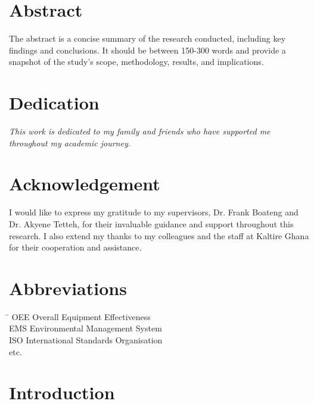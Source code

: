 \documentclass[12pt,a4paper]{report}
\begin{document}
	\chapter*{Abstract}
	The abstract is a concise summary of the research conducted, including key findings and conclusions. It should be between 150-300 words and provide a snapshot of the study’s scope, methodology, results, and implications.

	\chapter*{Dedication}
	\emph{This work is dedicated to my family and friends who have supported me throughout my academic journey.}

	\chapter*{Acknowledgement}
	I would like to express my gratitude to my supervisors, Dr. Frank Boateng and Dr. Akyene Tetteh, for their invaluable guidance and support throughout this research. I also extend my thanks to my colleagues and the staff at Kaltire Ghana for their cooperation and assistance.

	\tableofcontents

	\listoffigures

	\listoftables

	\chapter*{Abbreviations}
	\begin{tabbing}
		\hspace{2in} \= \kill
		OEE \> Overall Equipment Effectiveness \\
		EMS \> Environmental Management System \\
		ISO \> International Standards Organisation \\
		etc.
	\end{tabbing}

	\chapter{Introduction}
\end{document}
